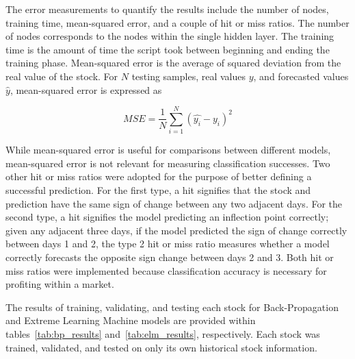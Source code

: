 The error measurements to quantify the results include the number of nodes, training time, mean-squared error, and a couple of hit or miss ratios.
The number of nodes corresponds to the nodes within the single hidden layer.
The training time is the amount of time the script took between beginning and ending the training phase.
Mean-squared error is the average of squared deviation from the real value of the stock.
For $N$ testing samples, real values $y$, and forecasted values $\hat{y}$, mean-squared error is expressed as

\begin{equation}
	MSE=\dfrac{1}{N}\sum_{i=1}^{N} (\hat{y_i} - y_i)^2\label{eq:equation11}
\end{equation}

While mean-squared error is useful for comparisons between different models, mean-squared error is not relevant for measuring classification successes.
Two other hit or miss ratios were adopted for the purpose of better defining a successful prediction.
For the first type, a hit signifies that the stock and prediction have the same sign of change between any two adjacent days.
For the second type, a hit signifies the model predicting an inflection point correctly; given any adjacent three days, if the model predicted the sign of change correctly between days 1 and 2, the type 2 hit or miss ratio measures whether a model correctly forecasts the opposite sign change between days 2 and 3.
Both hit or miss ratios were implemented because classification accuracy is necessary for profiting within a market.

The results of training, validating, and testing each stock for Back-Propagation and Extreme Learning Machine models are provided within tables\ \ref{tab:bp_results} and\ \ref{tab:elm_results}, respectively.
Each stock was trained, validated, and tested on only its own historical stock information.

